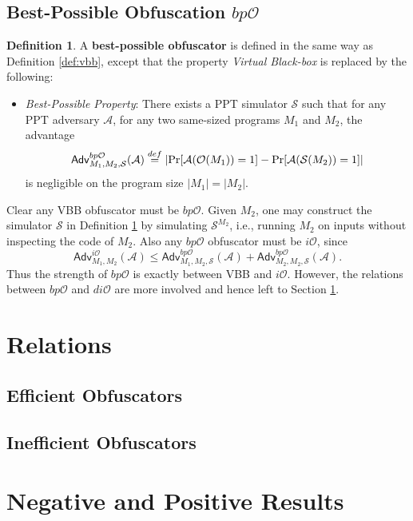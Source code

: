 \documentclass[12pt]{article}
\newcommand{\eqdef}{\stackrel{def}{=}}
\newcommand{\A}{\mathcal{A}}
\newcommand{\Sim}{\mathcal{S}}
\newcommand{\Adv}{\mathsf{Adv}}
\newcommand{\io}{i\mathcal{O}}
\newcommand{\dio}{di\mathcal{O}}
\newcommand{\bpo}{bp\mathcal{O}}
\theoremstyle{definition}
\newtheorem{definition}[theorem]{Definition}
\begin{document}
\subsection{Best-Possible Obfuscation $\bpo$}
\begin{definition}
\label{def:bp}
A {\bf best-possible obfuscator} is defined in the same way as Definition \ref{def:vbb}, except that the property \emph{Virtual Black-box} is replaced by the following:
\begin{itemize}
\item \emph{Best-Possible Property}: There exists a PPT simulator $\Sim$ such that for any PPT adversary $\A$, for any two same-sized programs $M_1$ and $M_2$, the advantage 
$$\Adv_{M_1,M_2,\Sim}^{\bpo}(\A) \eqdef \left| \Pr[\A(\bigoh(M_1)) = 1] - \Pr[\A(\Sim(M_2)) = 1] \right|$$
is negligible on the program size $|M_1| = |M_2|$.
\end{itemize}
\end{definition}
Clear any VBB obfuscator must be $\bpo$. Given $M_2$, one may construct the simulator $\Sim$ in Definition \ref{def:bp} by simulating $\Sim^{M_2}$, i.e., running $M_2$ on inputs without inspecting the code of $M_2$. Also any $\bpo$ obfuscator must be $\io$, since 
$$\Adv_{M_1,M_2}^{\io}(\A) \leq \Adv_{M_1,M_2,\Sim}^{\bpo}(\A) + \Adv_{M_2,M_2,\Sim}^{\bpo}(\A).$$ 
Thus the strength of $\bpo$ is exactly between VBB and $\io$. However, the relations between $\bpo$ and $\dio$ are more involved and hence left to Section \ref{sec:rel}.

\section{Relations}
\label{sec:rel}

\subsection{Efficient Obfuscators}

\subsection{Inefficient Obfuscators}

\section{Negative and Positive Results}



	
\end{document}
